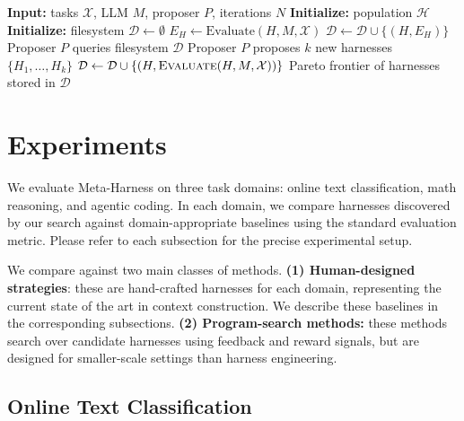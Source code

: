 \begin{algorithm}[t]
\caption{Meta-Harness outer loop over harnesses}
\label{alg:evolution}
\begin{algorithmic}[1]
\State \textbf{Input:} tasks $\mathcal{X}$, LLM $M$, proposer $P$, iterations $N$
\State \textbf{Initialize:} population $\mathcal{H}$ 
\State \textbf{Initialize:} filesystem $\mathcal{D} \leftarrow \emptyset$ 
  \State $E_H \leftarrow \textrm{Evaluate}(H, M, \mathcal{X})$
  \State $\mathcal{D} \leftarrow \mathcal{D} \cup \{(H, E_H)\}$
\EndFor
{}
  \State Proposer $P$ queries filesystem $\mathcal{D}$ 
  \State Proposer $P$ proposes $k$ new harnesses $\{H_1,\dots,H_k\}$
      \State $\mathcal{D} \leftarrow \mathcal{D} \cup \{(H,\textsc{Evaluate}(H,M,\mathcal{X}))\}$
    \EndIf
  \EndFor
\EndFor
\State \Return Pareto frontier of harnesses stored in $\mathcal{D}$
\end{algorithmic}
\end{algorithm}

\section{Experiments}
\label{sec:experiments}

We evaluate Meta-Harness on three task domains: online text classification, math reasoning, and agentic coding.
In each domain, we compare harnesses discovered by our search against domain-appropriate baselines using the standard evaluation metric.
Please refer to each subsection for the precise experimental setup.

We compare against two main classes of methods.
\textbf{(1) Human-designed strategies}: these are hand-crafted harnesses for each domain, representing the current state of the art in context construction.
We describe these baselines in the corresponding subsections.
\textbf{(2) Program-search methods:} these methods search over candidate harnesses using feedback and reward signals, but are designed for smaller-scale settings than harness engineering.

\subsection{Online Text Classification}
\label{subsec:text-classification}

